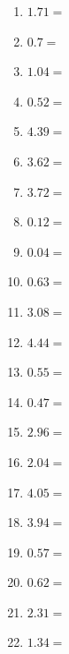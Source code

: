 \documentclass[12pt]{article}
\begin{document}
\begin{enumerate}
\newpage
\item \large $ 1.71 = $ \vspace{1.5cm}
\item \large $ 0.7 = $ \vspace{1.5cm}
\item \large $ 1.04 = $ \vspace{1.5cm}
\item \large $ 0.52 = $ \vspace{1.5cm}
\item \large $ 4.39 = $ \vspace{1.5cm}
\item \large $ 3.62 = $ \vspace{1.5cm}
\item \large $ 3.72 = $ \vspace{1.5cm}
\item \large $ 0.12 = $ \vspace{1.5cm}
\item \large $ 0.04 = $ \vspace{1.5cm}
\item \large $ 0.63 = $ \vspace{1.5cm}
\newpage
\item \large $ 3.08 = $ \vspace{1.5cm}
\item \large $ 4.44 = $ \vspace{1.5cm}
\item \large $ 0.55 = $ \vspace{1.5cm}
\item \large $ 0.47 = $ \vspace{1.5cm}
\item \large $ 2.96 = $ \vspace{1.5cm}
\item \large $ 2.04 = $ \vspace{1.5cm}
\item \large $ 4.05 = $ \vspace{1.5cm}
\item \large $ 3.94 = $ \vspace{1.5cm}
\item \large $ 0.57 = $ \vspace{1.5cm}
\item \large $ 0.62 = $ \vspace{1.5cm}
\newpage
\item \large $ 2.31 = $ \vspace{1.5cm}
\item \large $ 1.34 = $ \vspace{1.5cm}

\end{enumerate}
\end{document}
